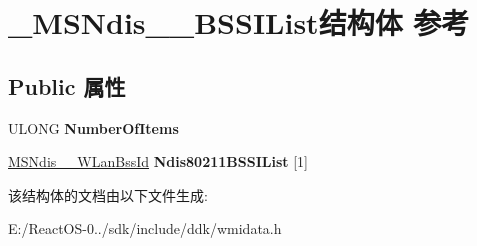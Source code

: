 \hypertarget{struct___m_s_ndis__80211___b_s_s_i_list}{}\section{\+\_\+\+M\+S\+Ndis\+\_\+\_\+\+B\+S\+S\+I\+List结构体 参考}
\label{struct___m_s_ndis__80211___b_s_s_i_list}
\subsection*{Public 属性}
\begin{DoxyCompactItemize}
\item 
\mbox{\label{struct___m_s_ndis__80211___b_s_s_i_list_a496fc057090d1d387b5e6288fb5ef1f1}} 
U\+L\+O\+NG {\bfseries Number\+Of\+Items}
\item 
\mbox{\label{struct___m_s_ndis__80211___b_s_s_i_list_aade61eaf5e7d0da9d995a4901d074188}} 
\hyperlink{struct___m_s_ndis__80211___w_lan_bss_id}{M\+S\+Ndis\+\_\+\_\+\+W\+Lan\+Bss\+Id} {\bfseries Ndis80211\+B\+S\+S\+I\+List} \mbox{[}1\mbox{]}
\end{DoxyCompactItemize}


该结构体的文档由以下文件生成\+:\begin{DoxyCompactItemize}
\item 
E\+:/\+React\+O\+S-\/0../sdk/include/ddk/wmidata.\+h\end{DoxyCompactItemize}
